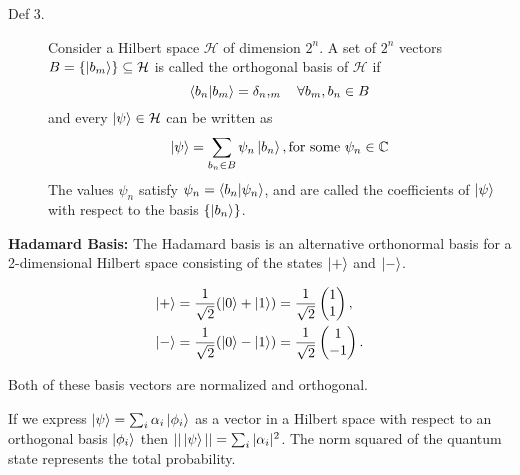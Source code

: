 \documentclass[12pt]{article}
\begin{document}
\begin{description}
    \item[Def 3.] Consider a Hilbert space \(\mathcal{H}\) of dimension \(2^n\). A set of \(2^n\) vectors \(B = \{\ket{b_m}\} \subseteq \mathcal{H}\) is called the orthogonal basis of \(\mathcal{H}\) if
    \begin{equation}
        \braket{b_n|b_m} = \delta_n,_m  \quad  \forall b_m, b_n \in B
    \end{equation}
    and every \(\ket{\psi} \in \mathcal{H}\) can be written as 
    \begin{equation}
        \ket{\psi} = \sum_{b_n \in B} \psi_n \ket{b_n}, \text{for some } \psi_n \in \mathbb{C}
    \end{equation}
    The values \(\psi_n\) satisfy \(\psi_n = \braket{b_n|\psi_n}\), and are called the coefficients of \(\ket{\psi}\) with respect to the basis \(\{\ket{b_n}\}\).
\end{description}

\begin{mdframed}
\textbf{Hadamard Basis:} The Hadamard basis is an alternative orthonormal basis for a 2-dimensional Hilbert space consisting of the states \(\ket{+}\) and \(\ket{-}\).

\begin{equation}
    \begin{split}
        \ket{+} &=  \frac{1}{\sqrt{2}} (\ket{0} + \ket{1}) = \frac{1}{\sqrt{2}} \begin{pmatrix} 
        1 \\ 
        1 
        \end{pmatrix}, \\
        \ket{-} &=  \frac{1}{\sqrt{2}} (\ket{0} - \ket{1}) = \frac{1}{\sqrt{2}} \begin{pmatrix} 
        1 \\ 
        -1 
        \end{pmatrix}.
    \end{split}
\end{equation}

Both of these basis vectors are normalized and orthogonal. 
\end{mdframed}

If we express \(\ket{\psi} = \sum_i \alpha_i \ket{\phi_i}\) as a vector in a Hilbert space with respect to an orthogonal basis \(\ket{\phi_i}\) then \(||\ket{\psi}|| = \sum_i |\alpha_i|^2 \). The norm squared of the quantum state represents the total probability.
\end{document}
